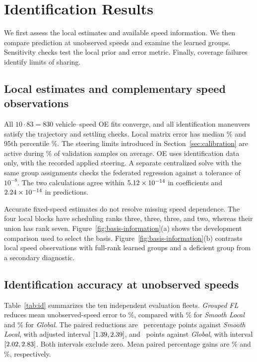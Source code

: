 \documentclass[conference]{IEEEtran}
\newcommand{\rev}[1]{\textcolor{revisiongreen}{#1}}
\newcommand{\revred}[1]{\textcolor{revisionred}{#1}}
\newcommand{\focusrev}[1]{\textcolor{focusedrevision}{#1}}
\newcommand{\method}[1]{\textit{#1}}
\newcommand{\SmoothLocal}{\method{Smooth Local}}
\newcommand{\GlobalModel}{\method{Global}}
\newcommand{\GroupedFL}{\method{Grouped FL}}
\begin{document}
\endgroup

\section{Identification Results}
\begingroup
\rev{We first assess the local estimates and available speed information.
We then compare prediction at unobserved speeds and examine the learned groups.
Sensitivity checks test} the local prior and error metric.
\rev{Finally, coverage failures identify limits of sharing}.

\subsection{Local \rev{estimates} and complementary \rev{speed observations}}
All \rev{$10\cdot83=830$ vehicle--speed} OE fits \rev{converge}, and all \rev{identification
maneuvers} satisfy the \rev{trajectory} and settling checks.
Local matrix error has median \OELocalMedian\% and 95th percentile
\OELocalPninetyfive\%. The steering \rev{limits introduced in
Section~\ref{sec:calibration} are} active during \OELimiterPercent\% of
validation samples on average. \focusrev{OE uses identification data only,
with the recorded applied steering.}
\revred{A separate centralized solve with the same group assignments checks the
federated regression against a tolerance of $10^{-8}$. The two calculations agree}
within $5.12\times10^{-14}$ in coefficients and $2.24\times10^{-14}$ in predictions.

Accurate \rev{fixed-speed estimates} do not resolve missing speed \rev{dependence.
The four} local blocks have \rev{scheduling} ranks three, three, three, and two,
whereas their union has rank seven. Figure~\ref{fig:basis-information}(\rev{a)
shows the development comparison used to select} the basis.
\rev{Figure~\ref{fig:basis-information}(b) contrasts local speed observations with
full-rank learned groups and a deficient group from a secondary diagnostic}.

\subsection{\rev{Identification accuracy at unobserved speeds}}
Table~\ref{tab:id} \rev{summarizes the ten independent evaluation fleets.
\GroupedFL{} reduces} mean unobserved-speed error to \OEFederatedUnseen\%,
compared with \OESmoothLocalUnseen\% for \SmoothLocal{} and
\OEGlobalUnseen\% for \GlobalModel{}.
The paired reductions are \OESmoothLocalDifference~percentage points against
\rev{\SmoothLocal{}}, with adjusted interval
$[1.39,2.39]$, and
\OEGlobalDifference~points against \GlobalModel{}, \rev{with interval}
$[2.02,2.83]$. Both \rev{intervals exclude zero.
Mean} paired percentage gains are \OESmoothLocalGain\% and \OEGlobalGain\%, \rev{respectively}.
\end{document}
